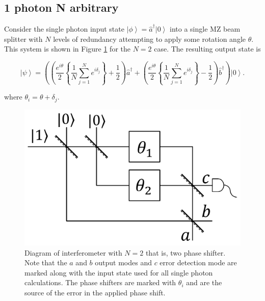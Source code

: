 \documentclass[aps,pra,twocolumn,superscriptaddress,numerical]{revtex4-1}
\begin{document}
	
	\subsection{1 photon N arbitrary \label{1 photon N arbitrary}}
	
		Consider the single photon input state $\left|\phi\right\rangle = \hat{a}^{\dagger}\left|0\right\rangle $ into a single MZ beam splitter with $N$ levels of redundancy attempting to apply some rotation angle $\theta$. This system is shown in Figure \ref{fig:MZ_setup} for the $N=2$ case. The resulting output state is
		
		\begin{widetext}
			\begin{equation}
				\left|\psi\right\rangle =\left(\left(\frac{e^{i\theta}}{2}\left\{ 	\frac{1}{N}\sum_{j=1}^{N}e^{i\delta_{j}}\right\} +\frac{1}{2}\right)\hat{a}^{\dagger}+\left(\frac{e^{i\theta}}{2}\left\{ \frac{1}{N}\sum_{j=1}^{N}e^{i\delta_{j}}\right\} -\frac{1}{2}\right)\hat{b}^{\dagger}\right)\left|0\right\rangle .\label{eq:1ParbN}
			\end{equation}
		\end{widetext}
	
		where $\theta_{i}=\theta+\delta_{j}$.
		\begin{figure}
			\includegraphics[width=\columnwidth]{2N1P.png}
			\caption{\label{fig:MZ_setup}Diagram of interferometer with $N=2$ that is, two phase shifter. Note that the $a$ and $b$ output modes and $c$ error detection mode are marked along with the input state used for all single photon calculations. The phase shifters are marked with $\theta_{i}$ and are the source of the error in the applied phase shift.}
		\end{figure}
		
\end{document}

